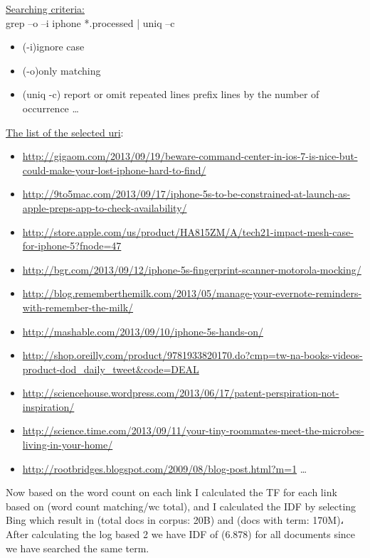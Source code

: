 \documentclass[letterpaper,11pt]{article}
\begin{document}
\uline{Searching criteria:}\\
grep –o –i iphone *.processed | uniq –c
\begin{itemize}
\item {(-i)ignore case}
\item {(-o)only matching}
\item {(uniq -c) report or omit repeated lines prefix lines by the number of occurrence}
\ldots
\end{itemize}

\uline{The list of the selected uri}:
\begin{itemize}
\item \url{http://gigaom.com/2013/09/19/beware-command-center-in-ios-7-is-nice-but-could-make-your-lost-iphone-hard-to-find/}
\item \url{http://9to5mac.com/2013/09/17/iphone-5s-to-be-constrained-at-launch-as-apple-preps-app-to-check-availability/}
\item \url{http://store.apple.com/us/product/HA815ZM/A/tech21-impact-mesh-case-for-iphone-5?fnode=47}
\item \url{http://bgr.com/2013/09/12/iphone-5s-fingerprint-scanner-motorola-mocking/}
\item \url{http://blog.rememberthemilk.com/2013/05/manage-your-evernote-reminders-with-remember-the-milk/}
\item \url{http://mashable.com/2013/09/10/iphone-5s-hands-on/}
\item \url{http://shop.oreilly.com/product/9781933820170.do?cmp=tw-na-books-videos-product-dod_daily_tweet&code=DEAL}
\item \url{http://sciencehouse.wordpress.com/2013/06/17/patent-perspiration-not-inspiration/}
\item \url{http://science.time.com/2013/09/11/your-tiny-roommates-meet-the-microbes-living-in-your-home/}
\item \url{http://rootbridges.blogspot.com/2009/08/blog-post.html?m=1}
\ldots
\end{itemize}

Now based on the word count on each link I calculated the TF for each link based on (word count matching/wc total), and I calculated the IDF by selecting Bing which result in (total docs in corpus: 20B) and (docs with term: 170M)، After calculating the log based 2 we have IDF of (6.878) for all documents since we have searched the same term.\\
 
\end{document}
